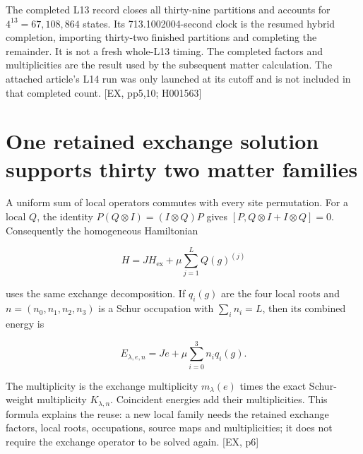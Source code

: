 The completed L13 record closes all thirty-nine partitions and accounts for \(4^{13}=67{,}108{,}864\) states. Its 713.1002004-second clock is the resumed hybrid completion, importing thirty-two finished partitions and completing the remainder. It is not a fresh whole-L13 timing. The completed factors and multiplicities are the result used by the subsequent matter calculation. The attached article's L14 run was only launched at its cutoff and is not included in that completed count. {[}EX, pp5,10; H001563{]}

\section{One retained exchange solution supports thirty two matter families}\label{one-retained-exchange-solution-supports-thirty-two-matter-families}

A uniform sum of local operators commutes with every site permutation. For a local \(Q\), the identity \(P(Q\otimes I)=(I\otimes Q)P\) gives \([P,Q\otimes I+I\otimes Q]=0\). Consequently the homogeneous Hamiltonian

\[
H=JH_{\mathrm{ex}}+\mu\sum_{j=1}^{L}Q(g)^{(j)}
\]

uses the same exchange decomposition. If \(q_i(g)\) are the four local roots and \(n=(n_0,n_1,n_2,n_3)\) is a Schur occupation with \(\sum_i n_i=L\), then its combined energy is

\[
E_{\lambda,e,n}=Je+\mu\sum_{i=0}^{3}n_iq_i(g).
\]

The multiplicity is the exchange multiplicity \(m_\lambda(e)\) times the exact Schur-weight multiplicity \(K_{\lambda,n}\). Coincident energies add their multiplicities. This formula explains the reuse: a new local family needs the retained exchange factors, local roots, occupations, source maps and multiplicities; it does not require the exchange operator to be solved again. {[}EX, p6{]}

